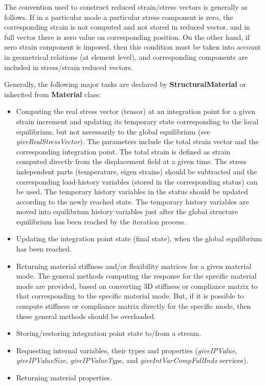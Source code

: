 \documentclass[a4paper]{article}
\newcommand{\class}[1]{{\bf #1}}
\newcommand{\service}[1]{{\em #1}}
\begin{document}
 The convention used to construct reduced strain/stress vectors is
 generally as follows.
 If in a particular mode a particular stress component is zero, the corresponding strain is not computed
 and not stored in reduced vector, and in full vector there is zero value on corresponding position.
 On the other hand, if zero strain component is imposed, then this condition must be taken into account in geometrical
 relations (at element level), and corresponding components are included
 in stress/strain reduced vectors.

 Generally, the following major tasks are declared by
 \class{StructuralMaterial} or inherited from \class{Material} class:
 \begin{itemize}
 \item
 Computing the real stress vector (tensor) at an integration point for
 a given strain increment and updating its temporary state corresponding to
 the local equilibrium, but not necessarily to the global equilibrium (see
 \service{giveRealStressVector}). The parameters include the total strain
 vector and the corresponding integration point. 
 The total strain is defined as strain computed directly from the
 displacement field at a given time.
 The stress independent parts (temperature, eigen strains) should be
 subtracted and  the corresponding load-history variables
 (stored in the corresponding status) can be used. The temporary
 history variables in the status should be updated according to the newly reached state.
 The temporary history variables are moved into equilibrium history
 variables just after the global structure
 equilibrium has been reached by the iteration process.
 \item
 Updating the integration point state (final state), when the global equilibrium
 has been reached. 
 \item
 Returning material stiffness and/or flexibility matrices for
 a given material mode. The general methods computing the response for
 the specific material mode are provided, based on converting 3D stiffness
 or compliance matrix to that corresponding to the specific material mode.
 But, if it is possible to compute stiffness or
 compliance matrix directly for the specific mode, then these general methods should be
 overloaded.
 \item
 Storing/restoring integration point state to/from a stream.
 \item
 Requesting internal variables, their types and properties
 (\service{giveIPValue}, \service{giveIPValueSize},
 \service{giveIPValueType}, and \service{giveIntVarCompFullIndx} services).
 \item
 Returning material properties.
 \end{itemize}
\end{document}
